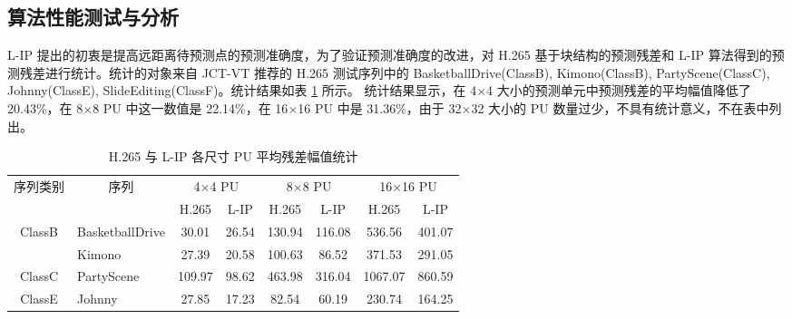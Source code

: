 \subsection{算法性能测试与分析}
\label{cha:L-IPTest}
L-IP 提出的初衷是提高远距离待预测点的预测准确度，为了验证预测准确度的改进，对 H.265 基于块结构的预测残差和 L-IP 算法得到的预测残差进行统计。统计的对象来自 JCT-VT 推荐的 H.265 测试序列中的 BasketballDrive(ClassB), Kimono(ClassB), PartyScene(ClassC), Johnny(ClassE), SlideEditing(ClassF)。统计结果如表 \ref{tab:L-IPResidualReduction} 所示。
统计结果显示，在 4$\times$4 大小的预测单元中预测残差的平均幅值降低了 20.43\%，在 8$\times$8 PU 中这一数值是 22.14\%，在 16$\times$16 PU 中是 31.36\%，由于 32$\times$32 大小的 PU 数量过少，不具有统计意义，不在表中列出。
\begin{table}[hbt]
    \centering
    \caption{H.265 与 L-IP 各尺寸 PU 平均残差幅值统计}
    \label{tab:L-IPResidualReduction}
    \begin{tabular}{@{}clcccccc@{}}
        \toprule
        \multirow{2}{*}{序列类别}                & \multicolumn{1}{c}{\multirow{2}{*}{序列}} & \multicolumn{2}{c}{4$\times$4 PU} & \multicolumn{2}{c}{8$\times$8 PU} & \multicolumn{2}{c}{16$\times$16 PU}                             \\ \cmidrule(l){3-8}
                                                 & \multicolumn{1}{c}{}                      & H.265                             & L-IP                              & H.265                               & L-IP   & H.265   & L-IP   \\ \midrule
        \multirow{2}{*}{ClassB}                  & BasketballDrive                           & 30.01                             & 26.54                             & 130.94                              & 116.08 & 536.56  & 401.07 \\
                                                 & Kimono                                    & 27.39                             & 20.58                             & 100.63                              & 86.52  & 371.53  & 291.05 \\
        ClassC                                   & PartyScene                                & 109.97                            & 98.62                             & 463.98                              & 316.04 & 1067.07 & 860.59 \\
        ClassE                                   & Johnny                                    & 27.85                             & 17.23                             & 82.54                               & 60.19  & 230.74  & 164.25 \\

\end{tabular}
\end{table}
